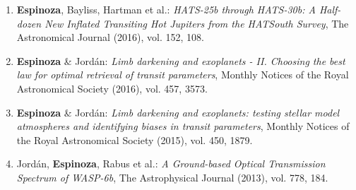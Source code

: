 \documentclass[11pt, a4paper]{article} %
\begin{document}
\begin{flushleft}
\begin{enumerate}
\item \textbf{Espinoza}, Bayliss, Hartman et al.: \textit{HATS-25b through HATS-30b: A Half-dozen New Inflated Transiting Hot Jupiters from the HATSouth Survey}, The Astronomical Journal (2016), vol. 152, 108.
\item \textbf{Espinoza} \& Jord\'an: \textit{Limb darkening and exoplanets - II. Choosing the best law for optimal retrieval of transit parameters}, Monthly Notices of the Royal Astronomical Society (2016), vol. 457, 3573.
\item \textbf{Espinoza} \& Jord\'an: \textit{Limb darkening and exoplanets: testing stellar model atmospheres and identifying biases in transit parameters}, Monthly Notices of the Royal Astronomical Society (2015), vol. 450, 1879.
\item Jord\'an, \textbf{Espinoza}, Rabus et al.: \textit{A Ground-based Optical Transmission Spectrum of WASP-6b}, The Astrophysical Journal (2013), vol. 778, 184.
\end{enumerate}


\end{flushleft}
\end{document}
